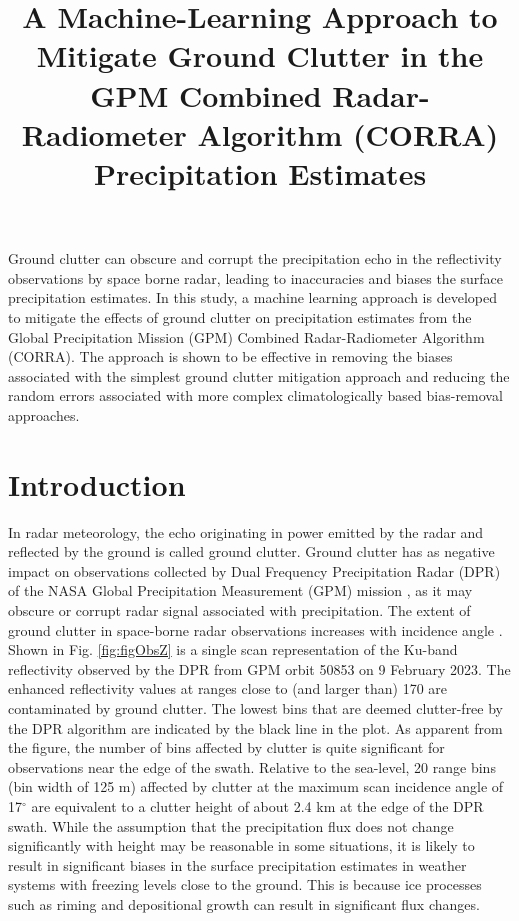 \documentclass{ametsocV6.1} %
\title{A Machine-Learning Approach to Mitigate Ground Clutter in the GPM Combined Radar-Radiometer Algorithm (CORRA) Precipitation Estimates}
\affiliation{\aff{a}{NASA Goddard Space Flight Center, Greenbelt, Maryland}\\
\aff{b}{Morgan State University, Baltimore, MD}\\
\aff{c}{Science Systems and Applications, Inc., Greenbelt, Maryland}\\
\aff{d}{University of Maryland, Baltimore County, Baltimore,Maryland}
}
\begin{document}
\maketitle
\statement
{Ground clutter can obscure and corrupt the precipitation echo in the reflectivity observations by space borne radar, leading to inaccuracies and biases the surface precipitation estimates. In this study, a machine learning approach is developed to mitigate the effects of ground clutter on precipitation estimates from the Global Precipitation Mission (GPM) Combined Radar-Radiometer Algorithm (CORRA).  The approach is shown to be effective in removing the biases associated with the simplest ground clutter mitigation approach and reducing the random errors associated with more complex climatologically based bias-removal approaches.}
\section{Introduction}

In radar meteorology, the echo originating in power emitted by the radar and reflected by the ground is called ground clutter. Ground clutter has as negative impact on observations collected by Dual Frequency Precipitation Radar (DPR) of the NASA Global Precipitation Measurement (GPM) mission \citep{gpm2017}, as it may obscure or corrupt radar signal associated with precipitation. The extent of ground clutter in space-borne radar observations increases with incidence angle \citep{kubota2016}. Shown in Fig. \ref{fig:figObsZ} is a single scan representation of the Ku-band reflectivity observed by the DPR from GPM orbit 50853 on 9 February 2023. The enhanced reflectivity values at ranges close to (and larger than) 170 are contaminated by ground clutter. The lowest bins that are deemed clutter-free by the DPR algorithm \citep{iguchi_atbd} are indicated by the black line in the plot. As apparent from the figure, the number of bins affected by clutter is quite significant for observations near the edge of the swath. Relative to the sea-level, 20 range bins (bin width of 125 m) affected by clutter at the maximum scan incidence angle of 17$^{\circ}$ are equivalent to a clutter height of about 2.4 km at the edge of the DPR swath.
While the assumption that the precipitation flux does not change significantly with height may be reasonable in some situations, it is likely to result in significant biases in the surface precipitation estimates in weather systems with freezing levels close to the ground. This is because ice processes such as riming and depositional growth can result in significant flux changes.
\end{document}
